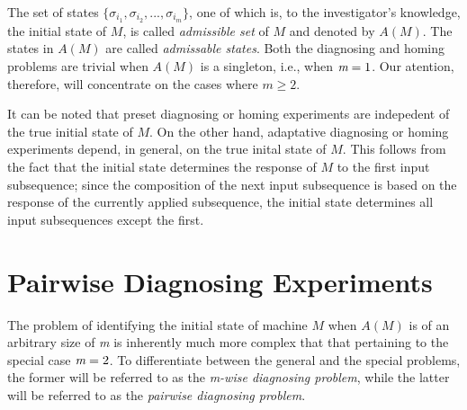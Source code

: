     The set of states $\{ \sigma_{i_{1}}, \sigma_{i_{2}}, ..., \sigma_{i_{m}} \} $, one of which is, to the investigator's knowledge, the initial state of $M$, is called \emph{admissible set} of $M$ and denoted by $A(M)$. The states in $A(M)$ are called \emph{admissable states}. Both the diagnosing and homing problems are trivial when $A(M)$ is a singleton, i.e., when $\emph{m}=1$. Our atention, therefore, will concentrate on the cases where $m \geq 2$.

    It can be noted that preset diagnosing or homing experiments are indepedent of the true initial state of $M$. On the other hand, adaptative diagnosing or homing experiments depend, in general, on the true inital state of $M$. This follows from the fact that the initial state determines the response of $M$ to the first input subsequence; since the composition of the next input subsequence is based on the response of the currently applied subsequence, the initial state determines all input subsequences except the first.

\section{Pairwise Diagnosing Experiments}

    The problem of identifying the initial state of machine $M$ when $A(M)$ is of an arbitrary size of \emph{m} is inherently much more complex that that pertaining to the special case $ \emph{m} = 2 $. To differentiate between the general and the special problems, the former will be referred to as the \emph{m-wise diagnosing problem}, while the latter will be referred to as the \emph{pairwise diagnosing problem}.

